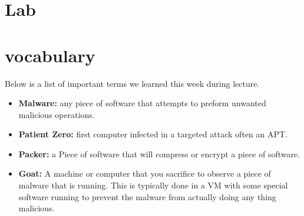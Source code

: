 \documentclass[letterpaper, onecolumn,10pt]{IEEEtran}
\begin{document}
		\section{Lab}
		
		\section{vocabulary}
		    Below is a list of important terms we learned this week during lecture.\\
		    \begin{itemize}
		        \item \textbf{Malware:} any piece of software that attempts to preform unwanted malicious operations.\\
		        \item \textbf{Patient Zero:} first computer infected in a targeted attack often an APT.\\
		        \item \textbf{Packer:} a Piece of software that will compress or encrypt a piece of software.\\
		        \item \textbf{Goat: } A machine or computer that you sacrifice to observe a piece of malware that is running. This is typically done in a VM with some special software running to prevent the malware from actually doing any thing malicious.\\
		    \end{itemize}
		
\end{document}
